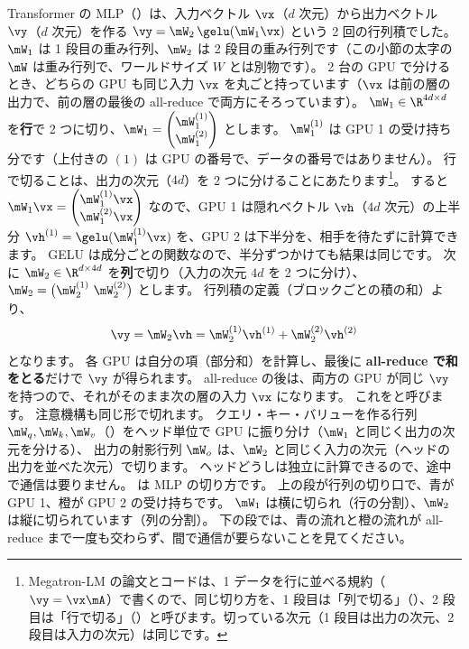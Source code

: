 Transformer の MLP（）は、入力ベクトル $\vx$（$d$ 次元）から出力ベクトル $\vy$（$d$ 次元）を作る $\vy=\mW_2\,\gelu(\mW_1\vx)$ という 2 回の行列積でした。
$\mW_1$ は 1 段目の重み行列、$\mW_2$ は 2 段目の重み行列です（この小節の太字の $\mW$ は重み行列で、ワールドサイズ $W$ とは別物です）。
2 台の GPU で分けるとき、どちらの GPU も同じ入力 $\vx$ を丸ごと持っています（$\vx$ は前の層の出力で、前の層の最後の all-reduce で両方にそろっています）。
$\mW_1\in\R^{4d\times d}$ を\textbf{行}で 2 つに切り、$\mW_1=\begin{pmatrix}\mW_1^{(1)}\\\mW_1^{(2)}\end{pmatrix}$ とします。
$\mW_1^{(1)}$ は GPU 1 の受け持ち分です（上付きの $(1)$ は GPU の番号で、データの番号ではありません）。
行で切ることは、出力の次元（$4d$）を 2 つに分けることにあたります\footnote{Megatron-LM の論文とコードは、1 データを行に並べる規約（$\vy=\vx\mA$）で書くので、同じ切り方を、1 段目は「列で切る」（）、2 段目は「行で切る」（）と呼びます。切っている次元（1 段目は出力の次元、2 段目は入力の次元）は同じです。}。
すると $\mW_1\vx=\begin{pmatrix}\mW_1^{(1)}\vx\\\mW_1^{(2)}\vx\end{pmatrix}$ なので、GPU 1 は隠れベクトル $\vh$（$4d$ 次元）の上半分 $\vh^{(1)}=\gelu(\mW_1^{(1)}\vx)$ を、GPU 2 は下半分を、相手を待たずに計算できます。
GELU は成分ごとの関数なので、半分ずつかけても結果は同じです。
次に $\mW_2\in\R^{d\times 4d}$ を\textbf{列}で切り（入力の次元 $4d$ を 2 つに分け）、$\mW_2=\bigl(\mW_2^{(1)}\ \mW_2^{(2)}\bigr)$ とします。
行列積の定義（ブロックごとの積の和）より、
\begin{equation}
\vy=\mW_2\vh=\mW_2^{(1)}\vh^{(1)}+\mW_2^{(2)}\vh^{(2)}
\label{eq:dist-tp}
\end{equation}
となります。
各 GPU は自分の項（部分和）を計算し、最後に \textbf{all-reduce で和をとる}だけで $\vy$ が得られます。
all-reduce の後は、両方の GPU が同じ $\vy$ を持つので、それがそのまま次の層の入力 $\vx$ になります。
これをと呼びます\cite{shoeybi2019megatron}。
注意機構も同じ形で切れます。
クエリ・キー・バリューを作る行列 $\mW_q,\mW_k,\mW_v$（）をヘッド単位で GPU に振り分け（$\mW_1$ と同じく出力の次元を分ける）、
出力の射影行列 $\mW_o$ は、$\mW_2$ と同じく入力の次元（ヘッドの出力を並べた次元）で切ります。
ヘッドどうしは独立に計算できるので、途中で通信は要りません。
は MLP の切り方です。
上の段が行列の切り口で、青が GPU 1、橙が GPU 2 の受け持ちです。
$\mW_1$ は横に切られ（行の分割）、$\mW_2$ は縦に切られています（列の分割）。
下の段では、青の流れと橙の流れが all-reduce まで一度も交わらず、間で通信が要らないことを見てください。

